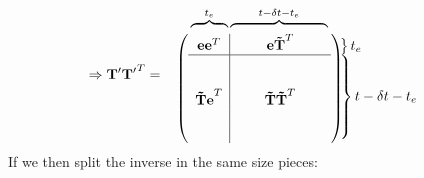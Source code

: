 \documentclass{article}
\begin{document}
\begin{equation}
	\Rightarrow \mathbf{T'T'}^T=
	\begin{array}{cl}
		\hspace{0.1cm}
		\overbrace{\hphantom{\begin{array}{c}
			{\ \quad\ } \end{array}}}^{t_e}
		\overbrace{\hphantom{\begin{array}{ccc}
		{\quad }&\mathbf{e\tilde{T}}^T&{\quad }\end{array}}}^{t-\delta t-t_e}&
		\\\

		\left(\begin{array}{c|ccc}
			\mathbf{ee}^T & {\quad } & \mathbf{e\tilde{T}}^T & {\quad } \\
			\hline\\
			{} & {} & {}\\
			\mathbf{\tilde{T}e}^T & {\quad } & \mathbf{\tilde{T}\tilde{T}}^T &
			{\quad }\\ 
			{} & {} & {}\\
			{} & {} & {}\\
		\end{array}\right)&

		\hspace{-1.0cm}
		\begin{array}{l}\left. \begin{array}{c} {} \end{array}\right\}t_e \\
		\left.\begin{array}{c} \\ \\ \\ \\ \\
		\end{array}\right\} t-\delta t-t_e
		\end{array}
	\end{array}
	\nonumber
\end{equation}
If we then split the inverse in the same size pieces:
\end{document}
